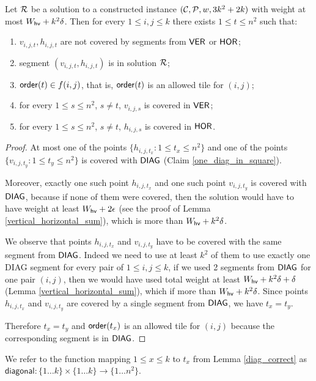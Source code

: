 \begin{lemma}
\label{diag_correct}
Let $\mathcal{R}$ be a solution to a constructed instance $(\mathcal{C}, \mathcal{P}, w, 3k^2+2k)$
with weight at most  $W_{\mathsf{hv}}+k^2\delta$.
Then for every $1 \le i,j \le k$
there exists $1 \le t \le n^2$ such that:
\begin{enumerate}[label={(\arabic*)}]
\item $v_{i,j,t}, h_{i,j,t}$ are not covered by segments from $\mathsf{VER}$ or $\mathsf{HOR}$;
\item segment $(v_{i,j,t}, h_{i,j,t})$ is in solution $\mathcal{R}$;
\item $\mathsf{order}(t) \in f(i,j)$, that is, $\mathsf{order}(t)$ is an allowed tile for $(i,j)$;
\item for every $1 \le s\le n^2$, $s \neq t$, $v_{i,j,s}$ is covered in $\mathsf{VER}$;
\item for every $1 \le s\le n^2$, $s \neq t$, $h_{i,j,s}$ is covered in $\mathsf{HOR}$.
\end{enumerate}
\end{lemma}

\begin{proof}
At most one of the points $\{h_{i,j,t_x} : 1 \le t_x \le n^2\}$
and one of the points $\{v_{i,j,t_y} : 1 \le t_y \le n^2\}$
is covered with $\mathsf{DIAG}$
(Claim \ref{one_diag_in_square}).
	
Moreover, exactly one such point $h_{i,j,t_x}$ and one such point $v_{i,j,t_y}$
is covered with $\mathsf{DIAG}$,
because if none of them were covered, then the solution would have to
have weight at least $W_{\mathsf{hv}} + 2\epsilon$ (see the proof of Lemma \ref{vertical_horizontal_sum}),
which is more than $W_{\mathsf{hv}}+k^2\delta$.

We observe that points $h_{i,j,t_x}$ and $v_{i,j,t_y}$
have to be covered with the same segment from $\mathsf{DIAG}$.
Indeed we need to use at least $k^2$ of them to use
exactly one DIAG segment for every pair of $1 \le i,j \le k$,
if we used 2 segments from $\mathsf{DIAG}$
for one pair $(i,j)$,
then we would have used total weight at least
$W_{\mathsf{hv}} + k^2\delta + \delta$ (Lemma \ref{vertical_horizontal_sum}),
which if more than $W_{\mathsf{hv}}+k^2\delta$.
Since points $h_{i,j,t_x}$ and $v_{i,j,t_y}$ are covered by
a single segment from $\mathsf{DIAG}$, we have $t_x = t_y$.

Therefore $t_x = t_y$
and $\mathsf{order}(t_x)$ is an allowed tile for $(i,j)$
because the corresponding segment is in $\mathsf{DIAG}$.
\end{proof}

\newcommand{\diagonal}{\mathsf{diagonal}}
We refer to the function mapping $1 \le x \le k$ to $t_x$ from Lemma \ref{diag_correct}
as $\diagonal : \{1 \ldots k\} \times \{1 \ldots k\} \rightarrow \{1 \ldots n^2\}$.

